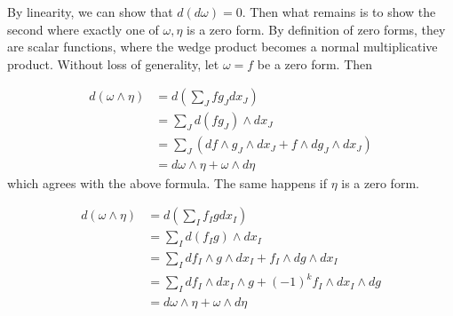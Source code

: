 \documentclass[12pt]{article}
\begin{document}
By linearity, we can show that $d(d\omega) = 0$. Then what remains is to show the second where exactly one of $\omega, \eta$ is a zero form. By definition of zero forms, they are scalar functions, where the wedge product becomes a normal multiplicative product. Without loss of generality, let $\omega = f$ be a zero form. Then

\begin{align*}
    d(\omega \wedge \eta) &= d\left(\sum_J fg_J dx_J\right) \\
                          &= \sum_J d(fg_J) \wedge dx_J \\
                          &= \sum_J (df \wedge g_J \wedge dx_J + f \wedge dg_J \wedge dx_J) \\
                          &= d\omega \wedge \eta + \omega \wedge d\eta
\end{align*}
which agrees with the above formula. The same happens if $\eta$ is a zero form.

\begin{align*}
    d(\omega \wedge \eta) &= d\left(\sum_If_Ig dx_I\right) \\
                          &= \sum_I d(f_Ig) \wedge dx_I \\
                          &= \sum_I df_I \wedge g \wedge dx_I + f_I \wedge dg \wedge dx_I \\
                          &= \sum_I df_I \wedge dx_I \wedge g + (-1)^k f_I \wedge dx_I \wedge dg \\
                          &= d\omega \wedge \eta + \omega \wedge d\eta
\end{align*}
\end{document}

